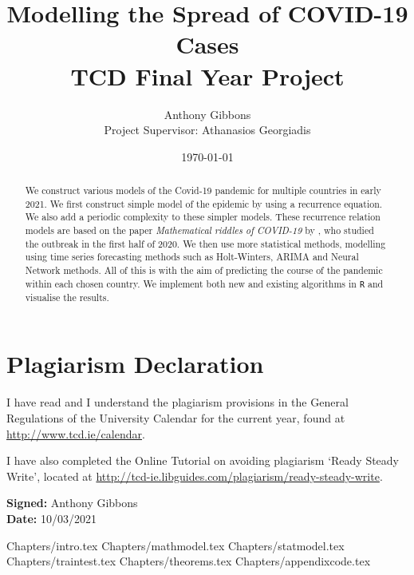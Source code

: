 \documentclass[a4paper]{article}
\title{Modelling the Spread of COVID-19 Cases \\ \large{TCD Final Year Project}}
\author{Anthony Gibbons \\  \normalsize{Project Supervisor: Athanasios Georgiadis}}
\date{\today}
\begin{document}
\maketitle      
\renewcommand\lstlistlistingname{List of Code}

\begin{abstract}
    We construct various models of the Covid-19 pandemic for multiple countries in early 2021. We first construct simple model of the epidemic by using a recurrence equation. We also add a periodic complexity to these simpler models. These recurrence relation models are based on the paper \textit{Mathematical riddles of COVID-19} by \citeauthor{grigor20} \cite{grigor20}, who studied the outbreak in the first half of 2020. We then use more statistical methods, modelling using time series forecasting methods such as Holt-Winters, ARIMA and Neural Network methods. All of this is with the aim of predicting the course of the pandemic within each chosen country. We implement both new and existing algorithms in \verb|R| and visualise the results.
\end{abstract}
\pagebreak
\section*{Plagiarism Declaration}
I have read and I understand the plagiarism provisions in the General
Regulations of the University Calendar for the current year, found at
\url{http://www.tcd.ie/calendar}.

I have also completed the Online Tutorial on avoiding plagiarism
‘Ready Steady Write’, located at
\url{http://tcd-ie.libguides.com/plagiarism/ready-steady-write}.

\textbf{Signed:} Anthony Gibbons \\
\textbf{Date:} 10/03/2021
\pagebreak

\hypersetup{
    linkcolor=black,
}

\tableofcontents \pagebreak

\listoffigures \pagebreak

\lstlistoflistings 

\listoftables \pagebreak

{Chapters/intro.tex}
\pagebreak
{Chapters/mathmodel.tex}
\pagebreak
{Chapters/statmodel.tex}
\pagebreak
{Chapters/traintest.tex}
\pagebreak
\appendix
{Chapters/theorems.tex}
\pagebreak
{Chapters/appendixcode.tex}
\pagebreak 
\printbibliography
\end{document}
